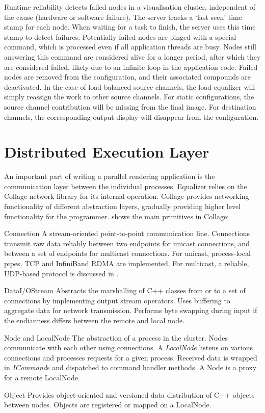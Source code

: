 Runtime reliability detects failed nodes in a visualisation cluster,
independent of the cause (hardware or software failure). The server tracks a
`last seen' time stamp for each node. When waiting for a task to finish, the
server uses this time stamp to detect failures. Potentially failed nodes are
pinged with a special command, which is processed even if all application
threads are busy. Nodes still answering this command are considered alive for a
longer period, after which they are considered failed, likely due to an
infinite loop in the application code. Failed nodes are removed from the
configuration, and their associated compounds are deactivated. In the case of
load balanced source channels, the load equalizer will simply reassign the work
to other source channels. For static configurations, the source channel
contribution will be missing from the final image. For destination channels,
the corresponding output display will disappear from the configuration.

\section{Distributed Execution Layer}

An important part of writing a parallel rendering application is the
communication layer between the individual processes. Equalizer relies on the
Collage network library for its internal operation. Collage provides networking
functionality of different abstraction layers, gradually providing higher level
functionality for the programmer.  shows the main primitives in
Collage:

\begin{compactdesc}
\item[Connection] A stream-oriented point-to-point communication
  line. Connections
  transmit raw data reliably between two endpoints for unicast connections, and
  between a set of endpoints for multicast connections. For unicast,
  process-local pipes, TCP and InfiniBand RDMA are implemented. For multicast,
  a reliable, UDP-based protocol is discussed in .
\item[DataI/OStream] Abstracts the marshalling of C++ classes from or to
  a set of connections by implementing output stream operators. Uses buffering
  to aggregate data for network transmission. Performs byte swapping during
  input if the endianness differs between the remote and local node.
\item[Node and LocalNode] The abstraction of a process in the cluster. Nodes
  communicate with each other using connections. A {\em LocalNode} listens on various
  connections and processes requests for a given process. Received data is
  wrapped in {\em ICommand}s and dispatched to command handler methods. A Node is a
  proxy for a remote LocalNode.
\item[Object] Provides object-oriented and versioned data distribution of C++
  objects between nodes. Objects are registered or mapped on a Local\-Node.
\end{compactdesc}

